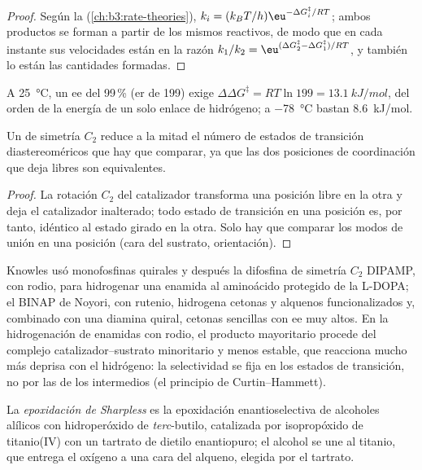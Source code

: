 \begin{proof}
Según la  (\cref{ch:b3:rate-theories}),
$k_i = (k_BT/h)\eu^{-\Delta G_i^\ddagger/RT}$; ambos productos se forman a partir de los mismos reactivos, de modo que en cada instante
sus velocidades están en la razón $k_1/k_2 = \eu^{(\Delta G_2^\ddagger - \Delta G_1^\ddagger)/RT}$, y también lo están las cantidades formadas.
\end{proof}

A \qty{25}{\celsius}, un ee del 99\,\% (er de 199) exige $\Delta\Delta G^\ddagger = RT\ln 199 = \qty{13.1}{kJ/mol}$, del orden de la energía de un
solo enlace de hidrógeno; a \qty{-78}{\celsius} bastan \qty{8.6}{kJ/mol}.

\begin{proposition}\label{prop:b3:asymmetric-synthesis:c2}
Un  de simetría $C_2$ reduce a la mitad el número de estados de transición diastereoméricos
que hay que comparar, ya que las dos posiciones de coordinación que deja libres son
equivalentes.
\end{proposition}

\begin{proof}
La rotación $C_2$ del catalizador transforma una posición libre en la otra y deja el
catalizador inalterado; todo estado de transición en una posición es, por tanto, idéntico al
estado girado en la otra. Solo hay que comparar los modos de unión en una posición (cara del sustrato,
orientación).
\end{proof}

Knowles usó monofosfinas quirales y después la difosfina de simetría $C_2$ DIPAMP, con rodio, para
hidrogenar una enamida al aminoácido protegido de la L-DOPA; el BINAP de Noyori,
con rutenio, hidrogena cetonas y alquenos funcionalizados y,
combinado con una diamina quiral, cetonas sencillas con ee muy altos. En la
hidrogenación de enamidas con rodio, el producto mayoritario procede del complejo catalizador--sustrato
minoritario y menos estable, que reacciona mucho más deprisa con el hidrógeno: la
selectividad se fija en los estados de transición, no por las  de los
intermedios (el principio de Curtin--Hammett).

\begin{definition}\label{def:b3:asymmetric-synthesis:sharpless}
La \emph{epoxidación de Sharpless} es la
epoxidación enantioselectiva de alcoholes alílicos con hidroperóxido de \textit{terc}-butilo,
catalizada por isopropóxido de titanio(IV) con un tartrato de dietilo enantiopuro; el
alcohol se une al titanio, que entrega el oxígeno a una cara del
alqueno, elegida por el tartrato.
\end{definition}

